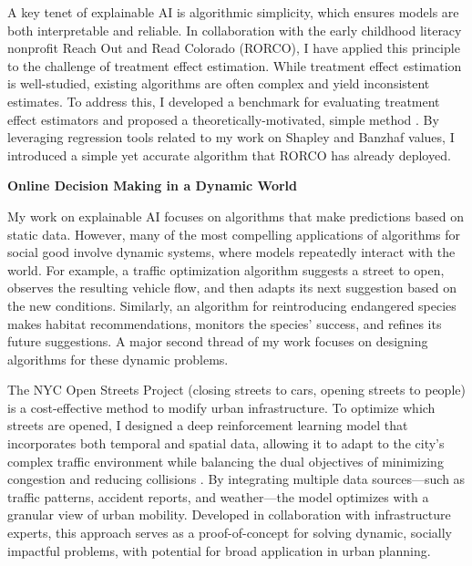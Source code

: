 \documentclass[11pt]{article}
\begin{document}
{A key tenet of explainable AI is algorithmic simplicity, which ensures models are both interpretable and reliable. In collaboration with the early childhood literacy nonprofit Reach Out and Read Colorado (RORCO), I have applied this principle to the challenge of treatment effect estimation. While treatment effect estimation is well-studied, existing algorithms are often complex and yield inconsistent estimates. To address this, I developed a benchmark for evaluating treatment effect estimators and proposed a theoretically-motivated, simple method \cite{witter2024benchmarking}. By leveraging regression tools related to my work on Shapley and Banzhaf values, I introduced a simple yet accurate algorithm that RORCO has already deployed.

\begin{center}
{\large \textbf{Online Decision Making in a Dynamic World}}
\end{center}

My work on explainable AI focuses on algorithms that make predictions based on static data. However, many of the most compelling applications of algorithms for social good involve dynamic systems, where models repeatedly interact with the world. For example, a traffic optimization algorithm suggests a street to open, observes the resulting vehicle flow, and then adapts its next suggestion based on the new conditions. Similarly, an algorithm for reintroducing endangered species makes habitat recommendations, monitors the species’ success, and refines its future suggestions. A major second thread of my work focuses on designing algorithms for these dynamic problems.

The NYC Open Streets Project (closing streets to cars, opening streets to people) is a cost-effective method to modify urban infrastructure. To optimize which streets are opened, I designed a deep reinforcement learning model that incorporates both temporal and spatial data, allowing it to adapt to the city's complex traffic environment while balancing the dual objectives of minimizing congestion and reducing collisions \cite{witter2024i}. By integrating multiple data sources—such as traffic patterns, accident reports, and weather—the model optimizes with a granular view of urban mobility. Developed in collaboration with infrastructure experts, this approach serves as a proof-of-concept for solving dynamic, socially impactful problems, with potential for broad application in urban planning.

}
\end{document}
